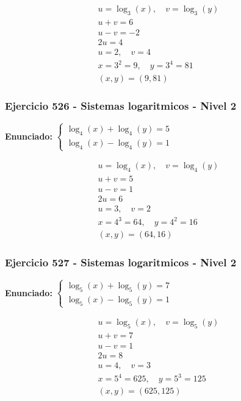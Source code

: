 \documentclass[12pt,a4paper]{article}
\begin{document}
\[
\begin{aligned}
u=\log_{3}\left(x\right),\quad v=\log_{3}\left(y\right)\\
u+v=6\\
u-v=-2\\
2u=4\\
u=2,\quad v=4\\
x=3^{2}=9,\quad y=3^{4}=81\\
\boxed{(x,y)=(9,81)}
\end{aligned}
\]


\subsubsection*{Ejercicio 526 - Sistemas logaritmicos - Nivel 2}
\textbf{Enunciado:} \(\begin{cases} \log_{4}\left(x\right)+\log_{4}\left(y\right)=5\\ \log_{4}\left(x\right)-\log_{4}\left(y\right)=1\end{cases}\)

\[
\begin{aligned}
u=\log_{4}\left(x\right),\quad v=\log_{4}\left(y\right)\\
u+v=5\\
u-v=1\\
2u=6\\
u=3,\quad v=2\\
x=4^{3}=64,\quad y=4^{2}=16\\
\boxed{(x,y)=(64,16)}
\end{aligned}
\]


\subsubsection*{Ejercicio 527 - Sistemas logaritmicos - Nivel 2}
\textbf{Enunciado:} \(\begin{cases} \log_{5}\left(x\right)+\log_{5}\left(y\right)=7\\ \log_{5}\left(x\right)-\log_{5}\left(y\right)=1\end{cases}\)

\[
\begin{aligned}
u=\log_{5}\left(x\right),\quad v=\log_{5}\left(y\right)\\
u+v=7\\
u-v=1\\
2u=8\\
u=4,\quad v=3\\
x=5^{4}=625,\quad y=5^{3}=125\\
\boxed{(x,y)=(625,125)}
\end{aligned}
\]
\end{document}

